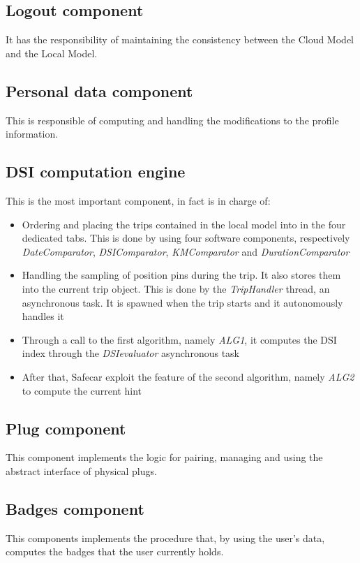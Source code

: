 \subsection{Logout component}
It has the responsibility of maintaining the consistency between the Cloud Model and the Local Model.

\subsection{Personal data component}
This is responsible of computing and handling the modifications to the profile information.

\subsection{DSI computation engine}
This is the most important component, in fact is in charge of:

\begin{itemize}
	\item Ordering and placing the trips contained in the local model into in the four dedicated tabs. This is done by using four software components, respectively \textit{DateComparator}, \textit{DSIComparator}, \textit{KMComparator} and \textit{DurationComparator}
	\item Handling the sampling of position pins during the trip. It also stores them into the current trip object. This is done by the \textit{TripHandler} thread, an asynchronous task. It is spawned when the trip starts and it autonomously handles it
	\item Through a call to the first algorithm, namely \textit{ALG1}, it computes the DSI index through the \textit{DSIevaluator} asynchronous task
	\item After that, Safecar exploit the feature of the second algorithm, namely \textit{ALG2} to compute the current hint
\end{itemize}

\subsection{Plug component}
This component implements the logic for pairing, managing and using the abstract interface of physical plugs.

\subsection{Badges component}
This components implements the procedure that, by using the user's data, computes the badges that the user currently holds.

